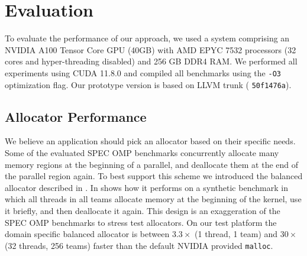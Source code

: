 
\section{Evaluation}
\label{sec:evaluation}


To evaluate the performance of our approach, we used a system comprising an NVIDIA A100 Tensor Core GPU (40GB) with AMD EPYC 7532 processors (32 cores and hyper-threading disabled) and 256 GB DDR4 RAM.
We performed all experiments using CUDA 11.8.0 and compiled all benchmarks using the \lstinline{-O3} optimization flag.
Our prototype version is based on LLVM trunk ( \lstinline{50f1476a}).

\subsection{Allocator Performance}

We believe an application should pick an allocator based on their specific needs.
Some of the evaluated SPEC OMP benchmarks concurrently allocate many memory regions at the beginning of a parallel, and deallocate them at the end of the parallel region again.
To best support this scheme we introduced the balanced allocator described in .
In  shows how it performs on a synthetic benchmark in which all threads in all teams allocate memory at the beginning of the kernel, use it briefly, and then deallocate it again.
This design is an exaggeration of the SPEC OMP benchmarks to stress test  allocators.
On our test platform the domain specific balanced allocator is between $3.3\times$ (1 thread, 1 team) and $30\times$ (32 threads, 256 teams) faster than the default NVIDIA provided \lstinline|malloc|.

